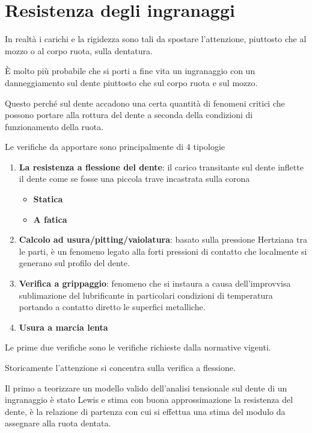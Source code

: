 \documentclass[a4paper, 15pt]{article}
\begin{document}
\section{Resistenza degli ingranaggi}
\begin{adjustwidth}{2in}{}
In realtà i carichi e la rigidezza sono tali da spostare l'attenzione, piuttosto che al mozzo o al corpo ruota, sulla dentatura. 

È molto più probabile che si porti a fine vita un  ingranaggio con un danneggiamento sul dente piuttosto che sul corpo ruota e sul mozzo. 

Questo perché sul dente accadono una certa quantità di fenomeni critici che possono portare alla rottura del dente a seconda della condizioni di funzionamento della ruota.\newline 

Le verifiche da apportare sono principalmente di 4 tipologie 
\begin{enumerate}
	\item \textbf{La resistenza a flessione del dente}: il carico transitante sul dente inflette il dente come se fosse una piccola trave incastrata sulla corona
	\begin{itemize}
		\item \textbf{Statica}
		\item \textbf{A fatica}
	\end{itemize}
	
	\item \textbf{Calcolo ad usura/pitting/vaiolatura}: basato sulla pressione Hertziana tra le parti, è un fenomeno legato alla forti pressioni  di contatto che localmente si generano sul profilo del dente. 
	
	\item \textbf{Verifica a grippaggio}: fenomeno che si instaura a causa dell'improvvisa sublimazione del lubrificante in particolari condizioni di temperatura portando a contatto diretto le superfici metalliche. 
	
	\item \textbf{Usura a marcia lenta}
\end{enumerate}

Le prime due verifiche sono le verifiche richieste dalla normative vigenti. \newline 

Storicamente l'attenzione si concentra sulla verifica a flessione. 

Il primo a teorizzare un modello valido dell'analisi tensionale sul dente di un ingranaggio è stato Lewis e stima con buona approssimazione la resistenza del dente, è la relazione di partenza con cui si effettua una stima del modulo da assegnare alla ruota dentata. 


\end{adjustwidth}
\end{document}
